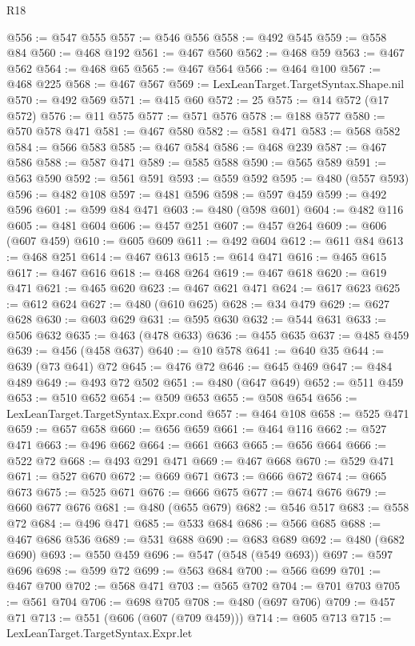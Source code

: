 \begin{lexlean}{R18}
\begin{coremodule}
@556 := @547 @555
@557 := @546 @556
@558 := @492 @545
@559 := @558 @84
@560 := @468 @192
@561 := @467 @560
@562 := @468 @59
@563 := @467 @562
@564 := @468 @65
@565 := @467 @564
@566 := @464 @100
@567 := @468 @225
@568 := @467 @567
@569 := LexLeanTarget.TargetSyntax.Shape.nil
@570 := @492 @569
@571 := @415 @60
@572 := 25
@575 := @14 @572 (@17 @572)
@576 := @11 @575
@577 := @571 @576
@578 := @188 @577
@580 := @570 @578 @471
@581 := @467 @580
@582 := @581 @471
@583 := @568 @582
@584 := @566 @583
@585 := @467 @584
@586 := @468 @239
@587 := @467 @586
@588 := @587 @471
@589 := @585 @588
@590 := @565 @589
@591 := @563 @590
@592 := @561 @591
@593 := @559 @592
@595 := @480 (@557 @593)
@596 := @482 @108
@597 := @481 @596
@598 := @597 @459
@599 := @492 @596
@601 := @599 @84 @471
@603 := @480 (@598 @601)
@604 := @482 @116
@605 := @481 @604
@606 := @457 @251
@607 := @457 @264
@609 := @606 (@607 @459)
@610 := @605 @609
@611 := @492 @604
@612 := @611 @84
@613 := @468 @251
@614 := @467 @613
@615 := @614 @471
@616 := @465 @615
@617 := @467 @616
@618 := @468 @264
@619 := @467 @618
@620 := @619 @471
@621 := @465 @620
@623 := @467 @621 @471
@624 := @617 @623
@625 := @612 @624
@627 := @480 (@610 @625)
@628 := @34 @479
@629 := @627 @628
@630 := @603 @629
@631 := @595 @630
@632 := @544 @631
@633 := @506 @632
@635 := @463 (@478 @633)
@636 := @455 @635
@637 := @485 @459
@639 := @456 (@458 @637)
@640 := @10 @578
@641 := @640 @35
@644 := @639 (@73 @641) @72
@645 := @476 @72
@646 := @645 @469
@647 := @484 @489
@649 := @493 @72 @502
@651 := @480 (@647 @649)
@652 := @511 @459
@653 := @510 @652
@654 := @509 @653
@655 := @508 @654
@656 := LexLeanTarget.TargetSyntax.Expr.cond
@657 := @464 @108
@658 := @525 @471
@659 := @657 @658
@660 := @656 @659
@661 := @464 @116
@662 := @527 @471
@663 := @496 @662
@664 := @661 @663
@665 := @656 @664
@666 := @522 @72
@668 := @493 @291 @471
@669 := @467 @668
@670 := @529 @471
@671 := @527 @670
@672 := @669 @671
@673 := @666 @672
@674 := @665 @673
@675 := @525 @671
@676 := @666 @675
@677 := @674 @676
@679 := @660 @677 @676
@681 := @480 (@655 @679)
@682 := @546 @517
@683 := @558 @72
@684 := @496 @471
@685 := @533 @684
@686 := @566 @685
@688 := @467 @686 @536
@689 := @531 @688
@690 := @683 @689
@692 := @480 (@682 @690)
@693 := @550 @459
@696 := @547 (@548 (@549 @693))
@697 := @597 @696
@698 := @599 @72
@699 := @563 @684
@700 := @566 @699
@701 := @467 @700
@702 := @568 @471
@703 := @565 @702
@704 := @701 @703
@705 := @561 @704
@706 := @698 @705
@708 := @480 (@697 @706)
@709 := @457 @71
@713 := @551 (@606 (@607 (@709 @459)))
@714 := @605 @713
@715 := LexLeanTarget.TargetSyntax.Expr.let

\end{coremodule}
\end{lexlean}
